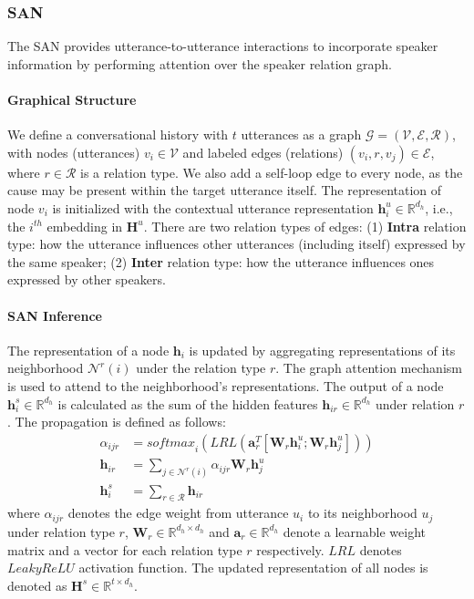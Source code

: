 \documentclass[11pt]{article}
\begin{document}
\subsubsection{SAN}
The SAN provides utterance-to-utterance interactions to incorporate speaker information by performing attention over the speaker relation graph.


\paragraph{Graphical Structure} We define a conversational history with $t$ utterances as a graph $\mathcal{G}=(\mathcal{V},\mathcal{E},\mathcal{R})$, with nodes (utterances) $v_i\in \mathcal{V}$ and labeled edges (relations) $(v_i,r,v_j)\in \mathcal{E}$, where $r\in \mathcal{R}$ is a relation type. We also add a self-loop edge to every node, as the cause may be present within the target utterance itself. The representation of node $v_i$ is initialized with the contextual utterance representation $\bm{h}^u_i\in \mathbb{R}^{d_h}$, i.e., the $i^{th}$ embedding in $\bm{H}^u$. There are two relation types of edges: (1) \textbf{Intra} relation type: how the utterance influences other utterances (including itself) expressed by the same speaker; (2) \textbf{Inter} relation type: how the utterance influences ones expressed by other speakers. 


\paragraph{SAN Inference} The representation of a node $\bm{h}_i$ is updated by aggregating representations of its neighborhood $\mathcal{N}^r(i)$ under the relation type $r$. The graph attention mechanism \citep{velivckovic2018graph} is used to attend to the neighborhood's representations. The output of a node $\bm{h}^s_i\in \mathbb{R}^{d_h}$ is calculated as the sum of the hidden features $\bm{h}_{ir}\in \mathbb{R}^{d_h}$ under relation $r$. The propagation is defined as follows:
\begin{align}
    \alpha_{ijr} &=\textit{softmax}_i(\textit{LRL}(\bm{a}^T_r[\bm{W}_r\bm{h}^u_i;\bm{W}_r\bm{h}^u_j]))\\
    \bm{h}_{ir} &= \sum_{j\in\mathcal{N}^r(i)}\alpha_{ijr}\bm{W}_r\bm{h}^u_j\label{equ}\\
    \bm{h}^s_i &= \sum_{r\in \mathcal{R}}\bm{h}_{ir}
\end{align}
where $\alpha_{ijr}$ denotes the edge weight from utterance $u_i$ to its neighborhood $u_j$ under relation type $r$, $\bm{W}_r\in \mathbb{R}^{d_h\times d_h}$ and $\bm{a}_r\in\mathbb{R}^{d_h}$ denote a learnable weight matrix and a vector for each relation type $r$ respectively. $\textit{LRL}$ denotes $\textit{LeakyReLU}$ activation function. The updated representation of all nodes is denoted as $\bm{H}^{s} \in \mathbb{R}^{t\times d_h}$.
\end{document}
